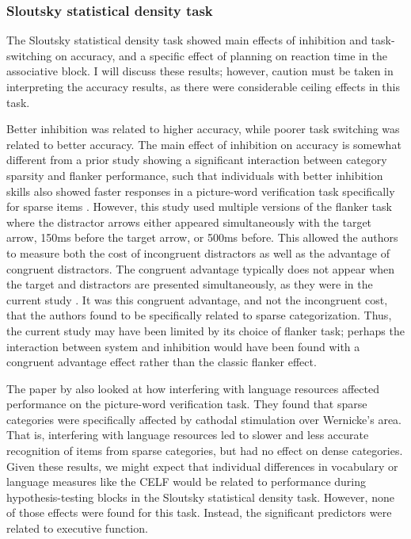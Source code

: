 \documentclass[../dissertation.tex]{subfiles}
\begin{document}
\subsubsection{Sloutsky statistical density task}
	The Sloutsky statistical density task showed main effects of inhibition and task-switching on accuracy, and a specific effect of planning on reaction time in the associative block. I will discuss these results; however, caution must be taken in interpreting the accuracy results, as there were considerable ceiling effects in this task. \par
	Better inhibition was related to higher accuracy, while poorer task switching was related to better accuracy. The main effect of inhibition on accuracy is somewhat different from a prior study showing a significant interaction between category sparsity and flanker performance, such that individuals with better inhibition skills also showed faster responses in a picture-word verification task specifically for sparse items \citep{Perry2016}. However, this study used multiple versions of the flanker task where the distractor arrows either appeared simultaneously with the target arrow, 150ms before the target arrow, or 500ms before. This allowed the authors to measure both the cost of incongruent distractors as well as the advantage of congruent distractors. The congruent advantage typically does not appear when the target and distractors are presented simultaneously, as they were in the current study \citep{Botella2002}. It was this congruent advantage, and not the incongruent cost, that the authors found to be specifically related to sparse categorization. Thus, the current study may have been limited by its choice of flanker task; perhaps the interaction between system and inhibition would have been found with a congruent advantage effect rather than the classic flanker effect.  \par 
	The paper by \citet{Perry2016} also looked at how interfering with language resources affected performance on the picture-word verification task. They found that sparse categories were specifically affected by cathodal stimulation over Wernicke's area. That is, interfering with language resources led to slower and less accurate recognition of items from sparse categories, but had no effect on dense categories. Given these results, we might expect that individual differences in vocabulary or language measures like the CELF would be related to performance during hypothesis-testing blocks in the Sloutsky statistical density task. However, none of those effects were found for this task. Instead, the significant predictors were related to executive function. \par 
\end{document}
